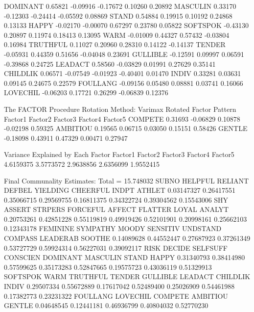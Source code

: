 \documentclass{article}
\begin{document}
\begin{Woutput}
DOMINANT         0.65821        -0.09916        -0.17672         0.10260         0.20892
MASCULIN         0.33170        -0.12303        -0.24414        -0.05592         0.08869
STAND            0.54884         0.19915         0.10192         0.24868         0.13133
HAPPY           -0.02170        -0.00070         0.67297         0.23780         0.05822
SOFTSPOK        -0.43130         0.20897         0.11974         0.18413         0.13095
WARM            -0.01009         0.44327         0.57432        -0.03804         0.16984
TRUTHFUL         0.11027         0.20960         0.28310         0.14122        -0.14137
TENDER          -0.05931         0.44359         0.51656        -0.04048         0.23691
GULLIBLE        -0.12591         0.09997         0.06591        -0.39868         0.24725
LEADACT          0.58560        -0.03829         0.01991         0.27629         0.35141
CHILDLIK         0.06571        -0.07549        -0.01923        -0.40401         0.01470
INDIV            0.33281         0.03631         0.09145         0.24675         0.22579
FOULLANG        -0.09156         0.05480         0.08881         0.03741         0.16066
LOVECHIL        -0.06203         0.17721         0.26299        -0.06839         0.12376

The FACTOR Procedure
Rotation Method: Varimax
                                 Rotated Factor Pattern
                 Factor1         Factor2         Factor3         Factor4         Factor5
COMPETE          0.31693        -0.06829         0.10878        -0.02198         0.59325
AMBITIOU         0.19565         0.06715         0.03050         0.15151         0.58426
GENTLE          -0.18098         0.43911         0.47329         0.00471         0.27947

                     Variance Explained by Each Factor
   Factor1         Factor2         Factor3         Factor4         Factor5
 4.6159375       3.5773572       2.9638856       2.6356099       1.9552415

                        Final Communality Estimates: Total = 15.748032
     SUBNO     HELPFUL     RELIANT      DEFBEL    YIELDING    CHEERFUL       INDPT      ATHLET
0.03147327  0.26417551  0.35066715  0.29569755  0.16811375  0.34322724  0.39304562  0.15543006
       SHY      ASSERT     STRPERS    FORCEFUL      AFFECT     FLATTER       LOYAL      ANALYT
0.20753261  0.42851228  0.55119819  0.49919426  0.52101901  0.20998161  0.25662103  0.12343178
  FEMININE    SYMPATHY       MOODY    SENSITIV    UNDSTAND     COMPASS    LEADERAB      SOOTHE
0.14089628  0.44552447  0.27687923  0.37261349  0.53727729  0.59924314  0.56227031  0.39092117
      RISK      DECIDE    SELFSUFF    CONSCIEN    DOMINANT    MASCULIN       STAND       HAPPY
0.31340793  0.38414980  0.57599625  0.35173283  0.52847665  0.19575723  0.43036119  0.51329913
  SOFTSPOK        WARM    TRUTHFUL      TENDER    GULLIBLE     LEADACT    CHILDLIK       INDIV
0.29507334  0.55672889  0.17617042  0.52489400  0.25026909  0.54461988  0.17382773  0.23231322
  FOULLANG        LOVECHIL         COMPETE        AMBITIOU          GENTLE
0.04648545      0.12441181      0.46936799      0.40804032      0.52770230


\end{Woutput}
\end{document}
